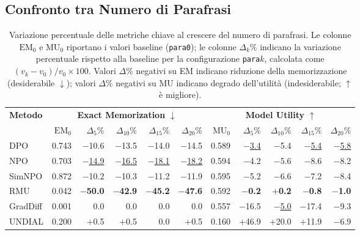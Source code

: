 \subsection{Confronto tra Numero di Parafrasi}

\begin{table}[H]
\centering
\small
\setlength{\tabcolsep}{4pt}
\begin{tabular}{l r rrrr r rrrr}
\toprule
\multirow{2}{*}{\textbf{Metodo}}
  & \multicolumn{5}{c}{\textbf{Exact Memorization} $\downarrow$}
  & \multicolumn{5}{c}{\textbf{Model Utility} $\uparrow$} \\
\cmidrule(lr){2-6} \cmidrule(lr){7-11}
  & $\text{EM}_0$ & $\Delta_5\%$ & $\Delta_{10}\%$ & $\Delta_{15}\%$ & $\Delta_{20}\%$
  & $\text{MU}_0$ & $\Delta_5\%$ & $\Delta_{10}\%$ & $\Delta_{15}\%$ & $\Delta_{20}\%$ \\
\midrule
DPO      & 0.743 & $-$10.6 & $-$13.5 & $-$14.0 & $-$14.5  &  0.589 & \underline{$-$3.4} & $-$5.4 & \underline{$-$5.4} & \underline{$-$5.8} \\
NPO      & 0.703 & \underline{$-$14.9} & \underline{$-$16.5} & \underline{$-$18.1} & \underline{$-$18.2}  &  0.594 & $-$4.2 & $-$5.6 & $-$8.6 & $-$8.2 \\
SimNPO   & 0.872 & $-$10.2 & $-$10.3 & $-$11.2 & $-$11.9  &  0.595 & $-$5.2 & $-$6.6 & $-$7.2 & $-$8.4 \\
RMU      & 0.042 & \textbf{$-$50.0} & \textbf{$-$42.9} & \textbf{$-$45.2} & \textbf{$-$47.6}  &  0.592 & \textbf{$-$0.2} & \textbf{$+$0.2} & \textbf{$-$0.8} & \textbf{$-$1.0} \\
GradDiff & 0.001 & 0.0 & 0.0 & 0.0 & 0.0 &  0.557 & $-$16.5 & \underline{$-$5.0} & $-$17.4 & $-$9.3 \\
UNDIAL   & 0.200 & $+$0.5  & $+$0.5  & $~~$0.0 & $+$0.5   &  0.160 & $+$46.9 & $+$20.0 & $+$11.9 & $-$6.9 \\
\bottomrule
\end{tabular}
\caption{Variazione percentuale delle metriche chiave al crescere del numero di parafrasi. Le colonne $\text{EM}_0$ e $\text{MU}_0$ riportano i valori baseline (\texttt{para0}); le colonne $\Delta_k\%$ indicano la variazione percentuale rispetto alla baseline per la configurazione \texttt{para}$k$, calcolata come $(v_k - v_0)/v_0 \times 100$. Valori $\Delta\%$ negativi su EM indicano riduzione della memorizzazione (desiderabile $\downarrow$); valori $\Delta\%$ negativi su MU indicano degrado dell'utilità (indesiderabile; $\uparrow$ è migliore).}
\label{tab:paraphrase_comparison}
\end{table}

